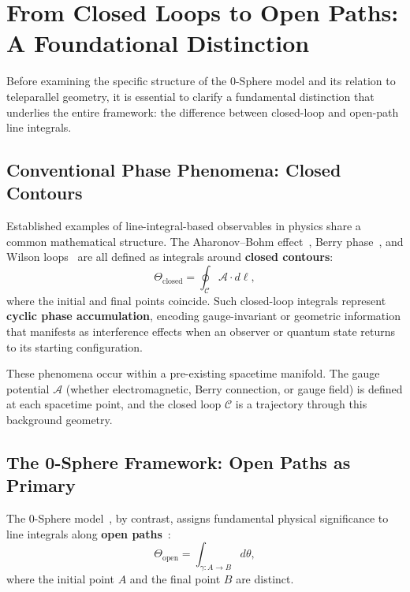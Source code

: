\documentclass[12pt,letterpaper]{article}
\begin{document}
\section{From Closed Loops to Open Paths: A Foundational Distinction}

\justifying
Before examining the specific structure of the 0-Sphere model and its relation to teleparallel geometry, it is essential to clarify a fundamental distinction that underlies the entire framework: the difference between closed-loop and open-path line integrals.

\subsection{Conventional Phase Phenomena: Closed Contours}

Established examples of line-integral-based observables in physics share a common mathematical structure. The Aharonov--Bohm effect~\cite{ABEffect}, Berry phase~\cite{Berry1984}, and Wilson loops~\cite{WilsonLoop} are all defined as integrals around \textbf{closed contours}:
\begin{equation}
\Theta_{\mathrm{closed}} = \oint_{\mathcal{C}} \mathcal{A} \cdot d\bm{\ell},
\end{equation}
where the initial and final points coincide. Such closed-loop integrals represent \textbf{cyclic phase accumulation}, encoding gauge-invariant or geometric information that manifests as interference effects when an observer or quantum state returns to its starting configuration.

These phenomena occur within a pre-existing spacetime manifold. The gauge potential $\mathcal{A}$ (whether electromagnetic, Berry connection, or gauge field) is defined at each spacetime point, and the closed loop $\mathcal{C}$ is a trajectory through this background geometry.

\subsection{The 0-Sphere Framework: Open Paths as Primary}

The 0-Sphere model~\cite{hanamura16759284}, by contrast, assigns fundamental physical significance to line integrals along \textbf{open paths}~\cite{hanamura18203433}:
\begin{equation}
\Theta_{\mathrm{open}} = \int_{\gamma: A \to B} d\theta,
\end{equation}
where the initial point $A$ and the final point $B$ are distinct.
\end{document}
